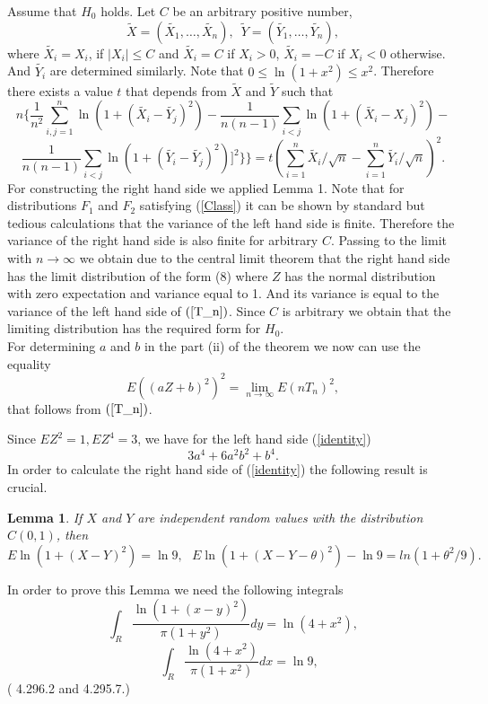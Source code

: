 \documentclass[final,11pt,3p]{elsarticle}
\newtheorem{lemma}{Lemma}
\begin{document}
Assume that $H_0$ holds. Let  $C$ be an arbitrary positive number,
$$
\tilde{X}=(\tilde{X_{1}},\ldots,\tilde{X_{n}}),\,\,\,
\tilde{Y}=(\tilde{Y_{1}},\ldots, \tilde{Y_{n}}),
$$
where $\tilde{X_{i}}=X_{i}$, if $
|X_{i}| \leq C$ and
 $\tilde{X_i}=C$ if $X_{i}>0$,
  $\tilde{X_i}=-C$ if $X_{i}<0$ otherwise. And $\tilde{Y_{i}}$ are determined similarly. Note that  $0 \leq \ln (1+x^2) \leq x^2$. Therefore there exists a value $t$ that depends from $\tilde{X}$ and $\tilde{Y}$ such that
\begin{equation}
n\{\frac{1}{n^2}\sum_{i,j=1}^n \ln(1 + (\tilde{X_{i}} - \tilde{Y_{j}})^2)-\frac{1}{n(n-1)}\sum_{i<j} \ln(1 + (\tilde{X_{i}} - X_j)^2) -
\end{equation}
\begin{equation}\label{T_n}
 \frac{1}{n(n-1)}\sum_{i<j}  \ln(1 + (\tilde{Y_{i}} - \tilde{Y_{j}})^2)]^2\}\}=
t
(\sum_{i=1}^n \tilde{X_{i}}/\sqrt{n}-\sum_{i=1}^n \tilde{Y_{i}}/\sqrt{n})^2.
\end{equation}
For constructing the right hand side we applied Lemma 1.
Note  that for distributions $F_1$ and $F_2$  satisfying (\ref{Class}) it can be shown by standard but tedious calculations that the variance of the left hand side is finite. Therefore the variance of the right hand side is also finite for arbitrary $C$.
Passing to the limit with $n\to \infty$ we obtain due to the central limit theorem that the right hand side has the limit distribution of the form (8) where  $Z$ has the normal distribution with zero expectation and variance equal to 1. And its variance  is equal to the variance of the left hand side  of $(\ref{T_n})$. Since $C$ is arbitrary we obtain that the limiting distribution has the required form for $H_0$. \\
 For determining $a$ and $b$ in the part (ii) of the theorem  we now can use the equality
 \begin{equation}\label{identity}
 E((aZ+b)^2)^2 =\lim_{n \to \infty}
 E(nT_n)^2,
 \end{equation}
 that follows from  $(\ref{T_n})$.

Since $E Z^2=1, EZ^4=3$,  we have for the left hand side (\ref{identity})
\begin{equation}\label{left}
3a^4 + 6a^2b^2 + b^4.
 \end{equation}
In order to calculate the right hand side of  (\ref{identity}) the following result is crucial.
\begin{lemma}If $X$ and $Y$ are independent random values with the distribution
$C(0,1)$, then
\begin{equation}
 E \ln(1+ (X- Y)^2)= \ln 9,\,\,\,\,
 E \ln(1+ (X- Y - \theta)^2)-\ln 9
 =
ln(1+ \theta^2/9).
\end{equation}
\end{lemma}
In order to prove this Lemma we need the following integrals
\begin{equation}
\label{i1}
\int_{R}
\frac {\ln(1+(x-y)^2)}{\pi(1+y^2)} dy = \ln(4+x^2),
\end{equation}
\begin{equation}
\label{i2}
\quad \int_{R} \frac {\ln(4+x^2)}{\pi(1+x^2)} dx = \ln 9,
\end{equation}
(\cite{GradRyzh2007}  4.296.2 and 4.295.7.)
\end{document}
